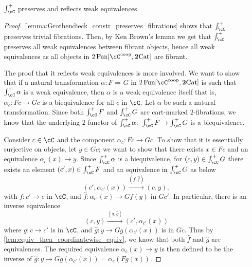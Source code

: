 \documentclass[11pt, dvipsnames]{amsart}
\begin{document}
    \begin{thm}\label{GCpreservesandreflectsweakequivs}
    $\int^+_{\cC}$ preserves and reflects weak equivalences.
    \end{thm}
    \begin{proof}  
    \cref{lemma:Grothendieck_constr_preserves_fibrations} shows that $\int_\cC^+$ preserves trivial fibrations. Then, by Ken Brown's lemma \cite[Lemma 1.1.12]{hovey} we get that $\int_\cC^+$ preserves all weak equivalences between fibrant objects, hence all weak equivalences as all objects in $2\Fun[\cC^\coop,\ttwocat]$ are fibrant.

  
    The proof that it reflects weak equivalences is more involved. We want to show that if a natural transformation $\alpha\colon F\Rightarrow G$ in $2\Fun[\cC^{\mathrm{coop}},\ttwocat]$ is such that $\int_{\cC}^+\alpha$ is a weak equivalence, then $\alpha$ is a weak equivalence itself \textemdash that is, $\alpha_c\colon Fc\to Gc$ is a biequivalence for all $c$ in $\cC$. Let $\alpha$ be such a natural transformation. Since both $\int_{\cC}^+ F$ and $\int_{\cC}^+ G$ are cart-marked $2$-fibrations, we know that the underlying 2-functor of $\int_{\cC}^+\alpha\colon \int_{\cC}^+ F\to \int_{\cC}^+ G$ is a biequivalence.


    Consider $c\in\cC$ and the component $\alpha_c\colon Fc\to Gc$. To show that it is essentially surjective on objects, let $y\in Gc$; we want to show that there exists $x\in Fc$ and an equivalence $\alpha_c(x)\to y$. Since $\int_{\cC}^+ \alpha$ is a biequivalence, for $(c,y)\in \int_{\cC}^+ G$ there exists an element $(c',x)\in\int_{\cC}^+ F$ and an equivalence in $\int_{\cC}^+ G$ as below 
    $$(c',\alpha_{c'}(x))\xrightarrow{(f,\widehat{f})}(c,y),$$
	with $f\colon c'\to c$ in $\cC$, and $\widehat{f}\colon\alpha_{c'}(x)\to Gf(y)$ in $Gc'$. In particular, there is an  inverse equivalence
    $$(c,y)\xrightarrow{(g,\widehat{g})}(c',\alpha_{c'}(x))$$
	where $g\colon c\to c'$ is in $\cC$, and $\widehat{g}\colon y \to Gg(\alpha_{c'}(x))$ is in $Gc$. Thus by \cref{lem:equiv_then_coordinatewise_equiv}, we know that both $\widehat{f}$ and $\widehat{g}$ are equivalences. The required equivalence $\alpha_c(x) \to y$ is then defined to be the inverse of $\widehat{g}\colon y\to Gg(\alpha_{c'}(x))=\alpha_c(Fg(x))$. 
    

\end{proof}
\end{document}
